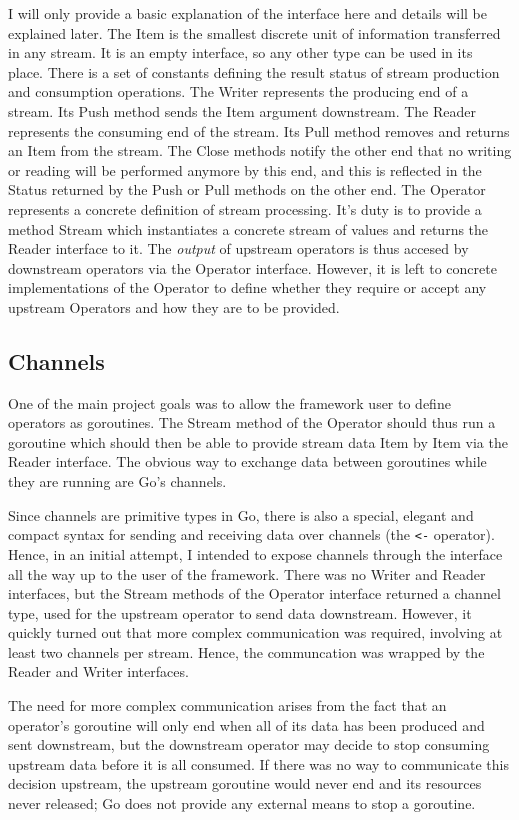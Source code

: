 \documentclass {article}
\begin{document}
I will only provide a basic explanation of the interface here and details will
be explained later. The Item is the smallest discrete unit of information
transferred in any stream. It is an empty interface, so any other type can be
used in its place. There is a set of constants defining the result status of
stream production and consumption operations. The Writer represents the
producing end of a stream. Its Push method sends the Item argument downstream.
The Reader represents the consuming end of the stream. Its Pull method removes
and returns an Item from the stream. The Close methods notify the other end that
no writing or reading will be performed anymore by this end, and this is
reflected in the Status returned by the Push or Pull methods on the other end.
The Operator represents a concrete definition of stream processing. It's duty is
to provide a method Stream which instantiates a concrete stream of values and
returns the Reader interface to it. The \emph{output} of upstream operators is
thus accesed
by downstream operators via the Operator interface. However, it is left to
concrete implementations of the Operator to define whether they require or
accept any upstream Operators and how they are to be provided.


\subsection{Channels}

One of the main project goals was to allow the framework user to define
operators as goroutines. The Stream method of the Operator should thus run a
goroutine which should then be able to provide stream data Item by Item via the
Reader interface. The obvious way to exchange data between goroutines while they
are running are Go's channels.

Since channels are primitive types in Go, there is also a special, elegant and
compact syntax for sending and receiving data over channels (the \lstinline|<-|
operator). Hence, in an initial attempt, I intended to expose channels through
the interface all the way up to the user of the framework. There was no Writer
and Reader interfaces, but the Stream methods of the Operator interface returned
a channel type, used for the upstream operator to send data downstream. However,
it quickly turned out that more complex communication was required, involving at
least two channels per stream. Hence, the communcation was wrapped by the Reader
and Writer interfaces.

The need for more complex communication arises from the fact that an operator's
goroutine will only end when all of its data has been produced and sent
downstream, but the downstream operator may decide to stop consuming upstream
data before it is all consumed. If there was no way to communicate this decision
upstream, the upstream goroutine would never end and its resources never
released; Go does not provide any external means to stop a goroutine.
\end{document}
